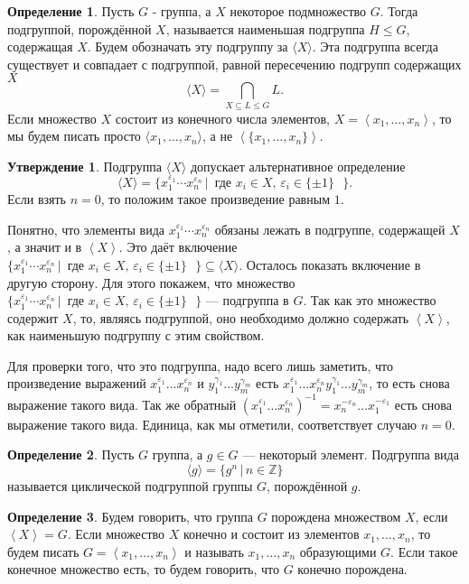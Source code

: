 \documentclass[10pt,a4paper,oneside]{book}
\theoremstyle{definition}
\newtheorem*{defn}{\color{yellow!30!red} Определение}
\newtheorem{utvr}{\color{blue!50!black}Утверждение}
\renewcommand{\leq}{\leqslant}
\newcommand{\mb}[1]{\mathbb{#1}}
\def\eps{\varepsilon}
\def\lan{\left\langle }
\def\ran{\right\rangle}
\def\dfn{\begin{defn}}
\def\edfn{\end{defn}}
\def\utv{\begin{utvr}}
\def\eutv{\end{utvr}}
\begin{document}
\dfn
Пусть $G$ - группа, а $X$ некоторое подмножество $G$. Тогда подгруппой, порождённой $X$, называется наименьшая подгруппа $H\leq G$, содержащая $X$. Будем обозначать эту подгруппу за $\langle X\rangle$. Эта подгруппа всегда существует и совпадает с подгруппой, равной пересечению подгрупп содержащих $X$
$$\langle X\rangle=\bigcap\limits_{ X\subseteq L \leq G} L.$$
Если множество $X$ состоит из конечного числа элементов, $X=\lan x_1,\dots, x_n\ran$,  то мы будем писать просто $\langle x_1 ,\dots, x_n\rangle$, а не $\lan\{x_1,\dots,x_n\}\ran$.
\edfn


\utv
Подгруппа $\langle X\rangle$ допускает альтернативное определение $$\langle X\rangle=\{x_1^{\eps_1}\cdots x_n^{\eps_n} \,|\, \text{ где $x_i\in X $, $\eps_i\in \{\pm 1\}$ }\}.$$
Если взять $n=0$, то положим такое произведение равным $1$.
\eutv
\proof Понятно, что элементы вида $x_1^{\eps_1}\cdots x_n^{\eps_n}$ обязаны лежать в подгруппе, содержащей $X$, а значит и в $\lan X\ran$. Это даёт включение $ \{x_1^{\eps_1}\cdots x_n^{\eps_n} \,|\, \text{ где $x_i\in X $, $\eps_i\in \{\pm 1\}$ }\} \subseteq \langle X\rangle.$ Осталось показать включение в другую сторону. Для этого покажем, что множество $\{x_1^{\eps_1}\cdots x_n^{\eps_n} \,|\, \text{ где $x_i\in X $, $\eps_i\in \{\pm 1\}$ }\}$ --- подгруппа в $G$. Так как это множество содержит $X$, то, являясь подгруппой, оно необходимо должно содержать $\lan X\ran$, как наименьшую подгруппу с этим свойством.

Для проверки того, что это подгруппа, надо всего лишь заметить, что произведение выражений $x_1^{\eps_1}\dots x_n^{\eps_n}$  и $y_1^{\gamma_1}\dots y_m^{\gamma_m}$ есть $x_1^{\eps_1}\dots x_n^{\eps_n}y_1^{\gamma_1}\dots y_m^{\gamma_m}$, то есть снова выражение такого вида. 
Так же обратный $(x_1^{\eps_1}\dots x_n^{\eps_n})^{-1}=x_n^{-\eps_n}\dots x_1^{-\eps_1}$ есть снова выражение такого вида. Единица, как мы отметили, соответствует случаю $n=0$.
\endproof

\dfn
Пусть $G$ группа, а $g\in G$ --- некоторый элемент. Подгруппа вида $$\langle g \rangle=\{g^n\,|\, n\in \mb Z\}$$
называется циклической подгруппой группы $G$, порождённой $g$.
\edfn

\dfn Будем говорить, что группа $G$ порождена множеством $X$, если $\lan X\ran =G$. Если множество $X$ конечно и состоит из элементов $x_1,\dots,x_n$, то будем писать $G=\lan x_1,\dots,x_n \ran$ и называть $x_1,\dots,x_n$ образующими $G$. Если такое конечное множество есть, то  будем говорить, что $G$ конечно порождена. 
\edfn
\end{document}
